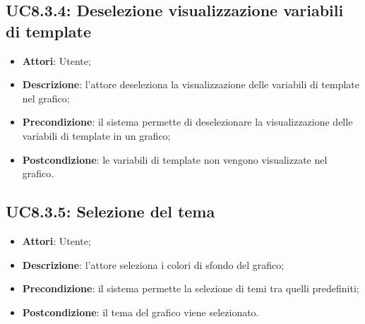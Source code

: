 \subsection{UC8.3.4: Deselezione visualizzazione variabili di template}
\hypertarget{UC8.3.4}{}
\begin{itemize}
	\item \textbf{Attori}: Utente;
	\item \textbf{Descrizione}: l'attore deseleziona la visualizzazione delle variabili di template nel grafico;
	\item \textbf{Precondizione}: il sistema permette di deselezionare la visualizzazione delle variabili di template in un grafico;
	\item \textbf{Postcondizione}: le variabili di template non vengono visualizzate nel grafico.
\end{itemize}

\subsection{UC8.3.5: Selezione del tema}
\hypertarget{UC8.3.5}{}
\begin{itemize}
	\item \textbf{Attori}: Utente;
	\item \textbf{Descrizione}: l'attore seleziona i colori di sfondo del grafico; 
	\item \textbf{Precondizione}: il sistema permette la selezione di temi tra quelli predefiniti;
	\item \textbf{Postcondizione}: il tema del grafico viene selezionato.
\end{itemize}

